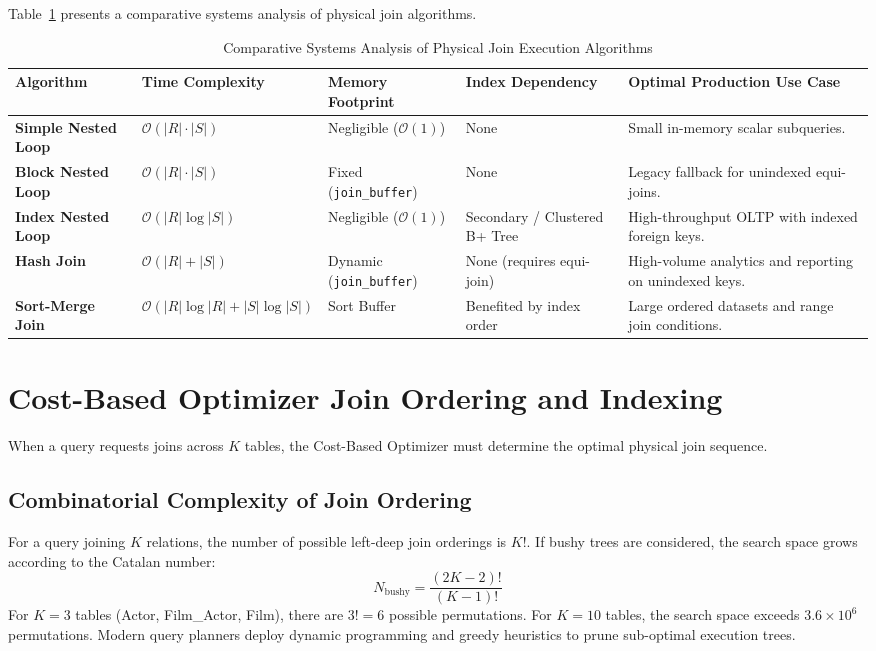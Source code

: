 \documentclass[10pt,twocolumn,letterpaper]{article}
\begin{document}
Table~\ref{tab:join_algorithms} presents a comparative systems analysis of physical join algorithms.

\begin{table}[htbp]
\caption{Comparative Systems Analysis of Physical Join Execution Algorithms}
\label{tab:join_algorithms}
\centering
\scriptsize
\begin{tabular}{p{2.3cm}p{2.1cm}p{2.2cm}p{2.9cm}p{5.1cm}}
\toprule
\textbf{Algorithm} & \textbf{Time Complexity} & \textbf{Memory Footprint} & \textbf{Index Dependency} & \textbf{Optimal Production Use Case} \\
\midrule
\textbf{Simple Nested Loop} & $\mathcal{O}(|R| \cdot |S|)$ & Negligible ($\mathcal{O}(1)$) & None & Small in-memory scalar subqueries. \\
\textbf{Block Nested Loop} & $\mathcal{O}(|R| \cdot |S|)$ & Fixed (\texttt{join\_buffer}) & None & Legacy fallback for unindexed equi-joins. \\
\textbf{Index Nested Loop} & $\mathcal{O}(|R| \log |S|)$ & Negligible ($\mathcal{O}(1)$) & Secondary / Clustered B+ Tree & High-throughput OLTP with indexed foreign keys. \\
\textbf{Hash Join} & $\mathcal{O}(|R| + |S|)$ & Dynamic (\texttt{join\_buffer}) & None (requires equi-join) & High-volume analytics and reporting on unindexed keys. \\
\textbf{Sort-Merge Join} & $\mathcal{O}(|R| \log |R| + |S| \log |S|)$ & Sort Buffer & Benefited by index order & Large ordered datasets and range join conditions. \\
\bottomrule
\end{tabular}
\end{table}

\section{Cost-Based Optimizer Join Ordering and Indexing}
\label{sec:optimizer_ordering}

When a query requests joins across $K$ tables, the Cost-Based Optimizer must determine the optimal physical join sequence.

\subsection{Combinatorial Complexity of Join Ordering}
For a query joining $K$ relations, the number of possible left-deep join orderings is $K!$. If bushy trees are considered, the search space grows according to the Catalan number:
\begin{equation}
N_{\text{bushy}} = \frac{(2K - 2)!}{(K - 1)!}
\end{equation}
For $K = 3$ tables (Actor, Film\_Actor, Film), there are $3! = 6$ possible permutations. For $K = 10$ tables, the search space exceeds $3.6 \times 10^6$ permutations. Modern query planners deploy dynamic programming and greedy heuristics to prune sub-optimal execution trees.
\end{document}
